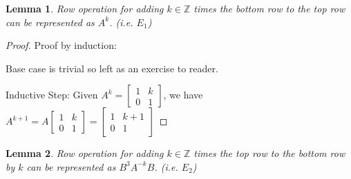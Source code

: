 \documentclass[11pt]{article}
\newcommand{\Z}{\mathbb{Z}}
\newtheorem{lemma}{Lemma}
\begin{document}
\begin{lemma}\label{lem2}
	Row operation for adding $k \in \Z$ times the bottom row to the top row can be represented as $A^{k}$. (i.e. \(E_1\))
\end{lemma}

\begin{proof}
	Proof by induction:

	Base case is trivial so left as an exercise to reader.

	Inductive Step: Given \(A^k=\begin{bmatrix} 
			1 & k\\
			0 & 1 
	\end{bmatrix}\), we have \(A^{k+1}=A\begin{bmatrix} 
			1 & k\\
			0 & 1
	\end{bmatrix}= \begin{bmatrix} 
			1 & k+1\\
			0 & 1 
	\end{bmatrix} \)
\end{proof}

\begin{lemma}
	Row operation for adding $k \in \Z$ times the top row to the bottom row by $k$ can be represented as $B^{3}A^{-k}B$. (i.e. \(E_2\))
\end{lemma}
\end{document}
